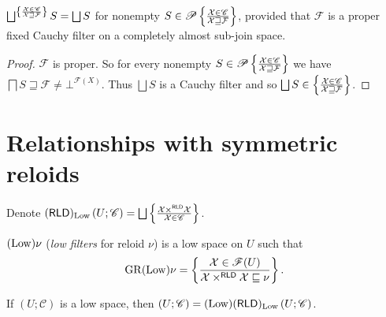 \begin{prop}
  $\bigsqcup^{
    \setcond{\mathcal{X} \in \mathscr{C} }{\mathcal{X} \sqsupseteq \mathcal{F}}
  } S = \bigsqcup S$ for nonempty
  $S \in \mathscr{P} \left\{ \frac{\mathcal{X} \in \mathscr{C} }{\mathcal{X} \sqsupseteq \mathcal{F}}\right\}$,
  provided that $\mathcal{F}$ is a proper fixed Cauchy filter on a  completely almost sub-join space.
\end{prop}

\begin{proof}
  $\mathcal{F}$ is proper. So for every nonempty $S \in \mathscr{P}
  \left\{ \frac{\mathcal{X} \in \mathscr{C} }{\mathcal{X} \sqsupseteq \mathcal{F}}\right\}$
  we have $\bigsqcap S \sqsupseteq \mathcal{F} \neq \bot^{\mathscr{F} (X)}$. Thus $\bigsqcup S$ is a Cauchy
  filter and so $\bigsqcup S \in \setcond{\mathcal{X} \in \mathscr{C} }{\mathcal{X} \sqsupseteq \mathcal{F}}$.
\end{proof}

\section{Relationships with symmetric reloids}


\begin{defn}
  Denote $(\mathsf{RLD})_{\Low} \left( U ; \mathscr{C} \right) =
  \bigsqcup \setcond{ \mathcal{X} \times^{\mathsf{RLD}} \mathcal{X}}
  {\mathcal{X} \in \mathscr{C} }$.
\end{defn}

\begin{defn}
  $(\operatorname{Low}) \nu$ (\emph{low filters} for reloid $\nu$) is a low
  space on $U$ such that
  \[ \operatorname{GR} (\operatorname{Low}) \nu = \left\{ \frac{\mathcal{X} \in \mathscr{F}(U)}{\mathcal{X} \times^{\mathsf{RLD}} \mathcal{X} \sqsubseteq \nu }\right\} . \]
\end{defn}

\begin{thm}
  If $\left( U ; \mathscr{C} \right)$ is a low space, then $\left( U ;
  \mathscr{C} \right) = (\operatorname{Low}) (\mathsf{RLD})_{\operatorname{Low}} \left(
  U ; \mathscr{C} \right)$.
\end{thm}

